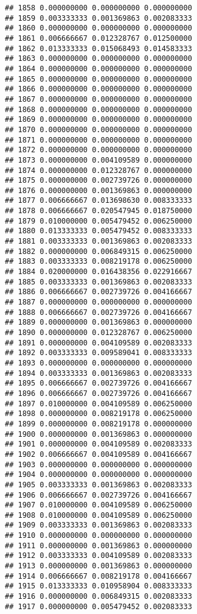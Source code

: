 \documentclass[
]{article}
\begin{document}
\begin{verbatim}
## 1858 0.000000000 0.000000000 0.000000000
## 1859 0.003333333 0.001369863 0.002083333
## 1860 0.000000000 0.000000000 0.000000000
## 1861 0.006666667 0.012328767 0.012500000
## 1862 0.013333333 0.015068493 0.014583333
## 1863 0.000000000 0.000000000 0.000000000
## 1864 0.000000000 0.000000000 0.000000000
## 1865 0.000000000 0.000000000 0.000000000
## 1866 0.000000000 0.000000000 0.000000000
## 1867 0.000000000 0.000000000 0.000000000
## 1868 0.000000000 0.000000000 0.000000000
## 1869 0.000000000 0.000000000 0.000000000
## 1870 0.000000000 0.000000000 0.000000000
## 1871 0.000000000 0.000000000 0.000000000
## 1872 0.000000000 0.000000000 0.000000000
## 1873 0.000000000 0.004109589 0.000000000
## 1874 0.000000000 0.012328767 0.000000000
## 1875 0.000000000 0.002739726 0.000000000
## 1876 0.000000000 0.001369863 0.000000000
## 1877 0.006666667 0.013698630 0.008333333
## 1878 0.006666667 0.020547945 0.018750000
## 1879 0.010000000 0.005479452 0.006250000
## 1880 0.013333333 0.005479452 0.008333333
## 1881 0.003333333 0.001369863 0.002083333
## 1882 0.000000000 0.006849315 0.006250000
## 1883 0.003333333 0.008219178 0.006250000
## 1884 0.020000000 0.016438356 0.022916667
## 1885 0.003333333 0.001369863 0.002083333
## 1886 0.006666667 0.002739726 0.004166667
## 1887 0.000000000 0.000000000 0.000000000
## 1888 0.006666667 0.002739726 0.004166667
## 1889 0.000000000 0.001369863 0.000000000
## 1890 0.000000000 0.012328767 0.006250000
## 1891 0.000000000 0.004109589 0.002083333
## 1892 0.003333333 0.009589041 0.008333333
## 1893 0.000000000 0.000000000 0.000000000
## 1894 0.003333333 0.001369863 0.002083333
## 1895 0.006666667 0.002739726 0.004166667
## 1896 0.006666667 0.002739726 0.004166667
## 1897 0.010000000 0.004109589 0.006250000
## 1898 0.000000000 0.008219178 0.006250000
## 1899 0.000000000 0.008219178 0.000000000
## 1900 0.000000000 0.001369863 0.000000000
## 1901 0.000000000 0.004109589 0.002083333
## 1902 0.006666667 0.004109589 0.004166667
## 1903 0.000000000 0.000000000 0.000000000
## 1904 0.000000000 0.000000000 0.000000000
## 1905 0.003333333 0.001369863 0.002083333
## 1906 0.006666667 0.002739726 0.004166667
## 1907 0.010000000 0.004109589 0.006250000
## 1908 0.010000000 0.004109589 0.006250000
## 1909 0.003333333 0.001369863 0.002083333
## 1910 0.000000000 0.000000000 0.000000000
## 1911 0.000000000 0.001369863 0.000000000
## 1912 0.003333333 0.004109589 0.002083333
## 1913 0.000000000 0.001369863 0.000000000
## 1914 0.006666667 0.008219178 0.004166667
## 1915 0.013333333 0.010958904 0.008333333
## 1916 0.000000000 0.006849315 0.002083333
## 1917 0.000000000 0.005479452 0.002083333

\end{verbatim}
\end{document}
